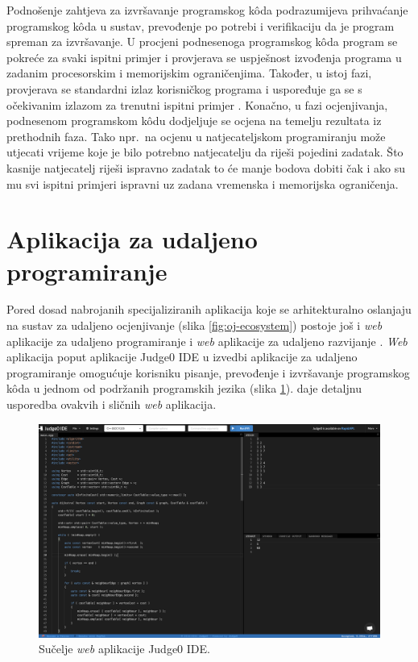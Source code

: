 \documentclass[times, utf8, diplomski]{fer}
\begin{document}
Podnošenje zahtjeva za izvršavanje programskog kôda podrazumijeva prihvaćanje programskog kôda u sustav, prevođenje po potrebi i verifikaciju da je program spreman za izvršavanje. U procjeni podnesenoga programskog kôda program se pokreće za svaki ispitni primjer i provjerava se uspješnost izvođenja programa u zadanim procesorskim i memorijskim ograničenjima. Također, u istoj fazi, provjerava se standardni izlaz  korisničkog programa i uspoređuje ga se s očekivanim izlazom za trenutni ispitni primjer . Konačno, u fazi ocjenjivanja, podnesenom programskom kôdu dodjeljuje se ocjena na temelju rezultata iz prethodnih faza. Tako npr.\ na ocjenu u natjecateljskom programiranju može utjecati vrijeme koje je bilo potrebno natjecatelju da riješi pojedini zadatak. Što kasnije natjecatelj riješi ispravno zadatak to će manje bodova dobiti čak i ako su mu svi ispitni primjeri ispravni uz zadana vremenska i memorijska ograničenja.

\section{Aplikacija za udaljeno programiranje}
Pored dosad nabrojanih specijaliziranih aplikacija koje se arhitekturalno oslanjaju na sustav za udaljeno ocjenjivanje (slika \ref{fig:oj-ecosystem}) postoje još i \textit{web} aplikacije za udaljeno programiranje  i \textit{web} aplikacije za udaljeno razvijanje . \textit{Web} aplikacija poput aplikacije Judge0 IDE \citep{Judge0IDE} u izvedbi aplikacije za udaljeno programiranje omogućuje korisniku pisanje, prevođenje i izvršavanje programskog kôda u jednom od podržanih programskih jezika (slika \ref{fig:judge0-ide-ui}). \citep{wasik2018survey} daje detaljnu usporedba ovakvih i sličnih \textit{web} aplikacija.

\begin{figure}[htb]
	\centering
	\includegraphics[width=\textwidth]{images/judge0-ide-ui.png}
	\caption{
		Sučelje \textit{web} aplikacije Judge0 IDE.
	}
	\label{fig:judge0-ide-ui}
\end{figure}
\end{document}
